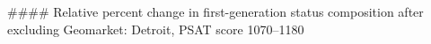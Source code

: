 #### Relative percent change in first-generation status composition after excluding Geomarket: Detroit, PSAT score 1070–1180
